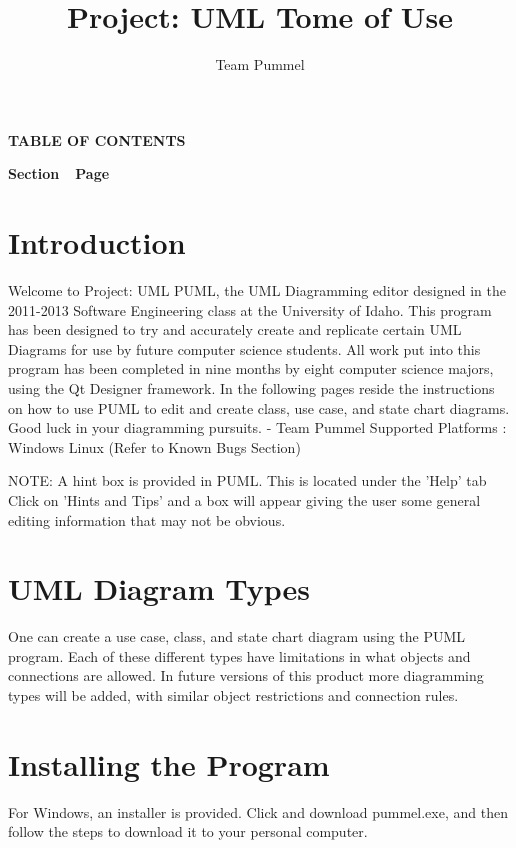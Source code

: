 \documentclass[]{article}
\begin{document}
\title{
Project: UML\linebreak 
\textbf{Tome of Use}}
\author{Team Pummel}
\maketitle

\newpage
{\centering{}\bfseries\color{black}
TABLE OF CONTENTS
\par}
{\bfseries\color{black}
Section\ \ Page}
\setcounter{tocdepth}{9}
\renewcommand\contentsname{}
\tableofcontents

\newpage
\section{Introduction}
{\color{black}
Welcome to Project: UML PUML, the UML Diagramming editor designed in the 2011-2013 Software Engineering class at the University of Idaho. This program has been designed to try and accurately create and replicate certain UML Diagrams for use by future computer science students. All work put into this program has been completed in nine months by eight computer science majors, using the Qt Designer framework. In the following pages reside the instructions on how to use PUML to edit and create class, use case, and state chart diagrams. Good luck in your diagramming pursuits. - Team Pummel
\linebreak
Supported Platforms : \newline
Windows \newline
Linux (Refer to Known Bugs Section)\newline

NOTE: A hint box is provided in PUML. This is located under the 'Help' tab Click on 'Hints and Tips' and a box will appear giving the user some general editing information that may not be obvious. 
}

\section{UML Diagram Types}
{\color{black}
One can create a use case, class, and state chart diagram using the PUML program. Each of these different types have limitations in what objects and connections are allowed. In future versions of this product more diagramming types will be added, with similar object restrictions and connection rules. 
}
\section{Installing the Program}
{\color{black}
For Windows, an installer is provided. Click and download pummel.exe, and then follow the steps to download it to your personal computer. 
}
\end{document}

